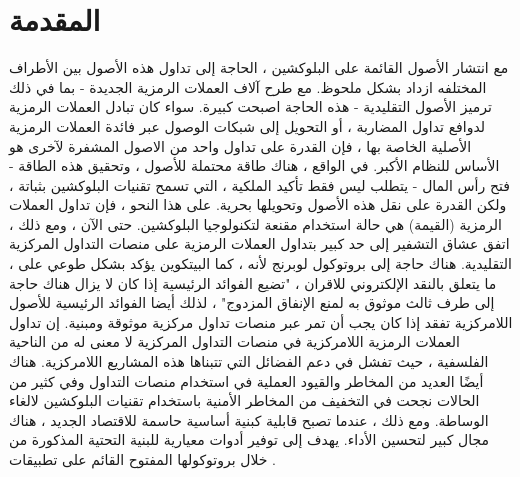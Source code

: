 \documentclass[12pt, a4paper, leqno]{report}
\theoremstyle{plain}
\theoremstyle{definition}
\begin{document}
\chapter{المقدمة}
\begin{multicols}{2}
\begin{otherlanguage}{arabic}
مع انتشار الأصول القائمة على البلوكشين ، الحاجة إلى تداول هذه الأصول بين الأطراف المختلفه ازداد بشكل ملحوظ. مع طرح آلاف العملات الرمزية الجديدة - بما في ذلك ترميز الأصول التقليدية - هذه الحاجة اصبحت كبيرة. سواء كان تبادل العملات الرمزية  لدوافع تداول المضاربة ، أو التحويل إلى شبكات الوصول عبر فائدة العملات الرمزية الأصلية الخاصة بها ، فإن القدرة على تداول واحد من الاصول المشفرة لآخرى هو الأساس للنظام الأكبر. في الواقع ، هناك طاقة محتملة للأصول  ، وتحقيق هذه الطاقة - فتح رأس المال - يتطلب ليس فقط تأكيد الملكية ، التي تسمح تقنيات البلوكشين بثباتة ، ولكن القدرة على نقل هذه الأصول وتحويلها بحرية.
على هذا النحو ، فإن تداول العملات الرمزية (القيمة) هي حالة استخدام مقنعة لتكنولوجيا البلوكشين. حتى الآن ، ومع ذلك ، اتفق عشاق التشفير إلى حد كبير بتداول العملات الرمزية على منصات التداول المركزية التقليدية. هناك حاجة إلى بروتوكول لوبرنج لأنه ، كما البيتكوين  يؤكد بشكل طوعي على ، ما يتعلق بالنقد الإلكتروني للاقران  ، "تضيع الفوائد الرئيسية إذا كان لا يزال هناك حاجة إلى طرف ثالث موثوق به لمنع الإنفاق المزدوج" ، لذلك أيضا الفوائد الرئيسية للأصول اللامركزية تفقد إذا كان يجب أن تمر عبر منصات تداول مركزية موثوقة ومبنية.
إن تداول العملات الرمزية اللامركزية في منصات التداول  المركزية لا معنى له من الناحية الفلسفية ، حيث تفشل في دعم الفضائل التي تتبناها هذه المشاريع اللامركزية. هناك أيضًا العديد من المخاطر والقيود العملية في استخدام منصات التداول  وفي كثير من الحالات نجحت في التخفيف من المخاطر الأمنية باستخدام تقنيات البلوكشين لالغاء الوساطة. ومع ذلك ، عندما تصبح قابلية  كبنية أساسية حاسمة للاقتصاد الجديد ، هناك مجال كبير لتحسين الأداء. يهدف   إلى توفير أدوات معيارية للبنية التحتية المذكورة من خلال  بروتوكولها المفتوح القائم على تطبيقات .
\end{otherlanguage}
\end{multicols}

\end{document}
